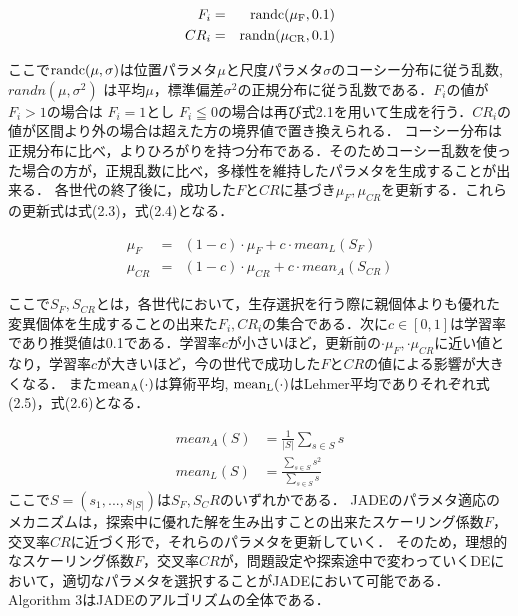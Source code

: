 \documentclass[a4paper,11pt,oneside,openany]{jsbook}
\begin{document}
\begin{eqnarray}
  F_i & = & \rm{randc}(\mu _F, 0.1) \\
  CR_i & = & \rm{randn}(\mu _{CR}, 0.1)
\end{eqnarray}

ここで$\rm{randc}(\mu,\sigma)$は位置パラメタ$\mu$と尺度パラメタ$\sigma$のコーシー分布に従う乱数,$randn(\mu,\sigma^2)$ は平均$\mu$，標準偏差$\sigma^2$の正規分布に従う乱数である．$F_i$の値が$F_i>1$の場合は
$F_i=1$とし $F_i\leqq0$の場合は再び式2.1を用いて生成を行う．$CR_i$の値が区間より外の場合は超えた方の境界値で置き換えられる．
コーシー分布は正規分布に比べ，よりひろがりを持つ分布である．そのためコーシー乱数を使った場合の方が，正規乱数に比べ，多様性を維持したパラメタを生成することが出来る．
各世代の終了後に，成功した${F}$と${CR}$に基づき$\mu_F, \mu_{CR}$を更新する．これらの更新式は式(2.3)，式(2.4)となる．

\begin{eqnarray}
  \mu_F & = & (1 - c)\cdot\mu_F + c\cdot mean_L(S_F)\\
  \mu_{CR} & = & (1 - c)\cdot\mu_{CR} + c\cdot mean_A(S_{CR})
\end{eqnarray}

ここで$S_F,S_{CR}$とは，各世代において，生存選択を行う際に親個体よりも優れた変異個体を生成することの出来た$F_i,CR_i$の集合である．次に$c\in[0,1]$は学習率であり推奨値は0.1である．学習率$c$が小さいほど，更新前の$\cdot\mu_F,\cdot\mu_{CR}$に近い値となり，学習率$c$が大きいほど，今の世代で成功した${F}$と${CR}$の値による影響が大きくなる．
また$\rm{mean}_A(\cdot)$は算術平均, $\rm{mean}_L(\cdot)$はLehmer平均でありそれぞれ式(2.5)，式(2.6)となる．

\begin{eqnarray}
  mean_A(S) & = \frac{1}{|S|}\sum_{s\in S}s \\
  mean_L(S) & = \frac{\sum_{s\in S}s^2}{\sum_{s\in S}s}
\end{eqnarray}
ここで$S=(s_1,..., s_{|S|})$は$S_F,S_CR$のいずれかである．
JADEのパラメタ適応のメカニズムは，探索中に優れた解を生み出すことの出来たスケーリング係数$F$，交叉率$CR$に近づく形で，それらのパラメタを更新していく．
そのため，理想的なスケーリング係数$F$，交叉率$CR$が，問題設定や探索途中で変わっていくDEにおいて，適切なパラメタを選択することがJADEにおいて可能である．
Algorithm 3はJADEのアルゴリズムの全体である．
\end{document}
